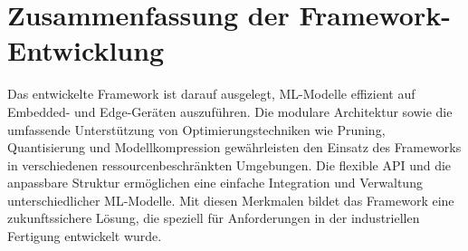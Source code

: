 \section{Zusammenfassung der Framework-Entwicklung}

Das entwickelte Framework ist darauf ausgelegt, ML-Modelle effizient auf Embedded- und Edge-Geräten auszuführen. Die modulare Architektur sowie die umfassende Unterstützung 
von Optimierungstechniken wie Pruning, Quantisierung und Modellkompression gewährleisten den Einsatz des Frameworks in verschiedenen ressourcenbeschränkten Umgebungen. 
Die flexible API und die anpassbare Struktur ermöglichen eine einfache Integration und Verwaltung unterschiedlicher ML-Modelle. Mit diesen Merkmalen bildet das Framework eine 
zukunftssichere Lösung, die speziell für Anforderungen in der industriellen Fertigung entwickelt wurde.